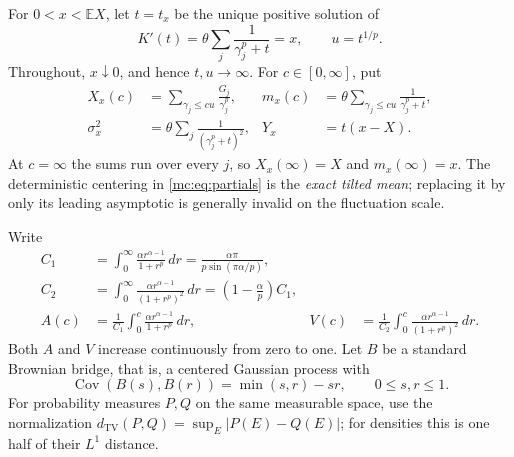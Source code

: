 For $0<x<\mathbb E X$, let $t=t_x$ be the unique positive solution of
\begin{equation}\label{mc:eq:saddle}
 K'(t)=\theta\sum_j\frac{1}{\gamma_j^p+t}=x,
 \qquad u=t^{1/p}.
\end{equation}
Throughout, $x\downarrow0$, and hence $t,u\longrightarrow\infty$.
For $c\in[0,\infty]$, put
\begin{align}
 X_x(c)&=\sum_{\gamma_j\leq cu}\frac{G_j}{\gamma_j^p},
 &m_x(c)&=\theta\sum_{\gamma_j\leq cu}\frac{1}{\gamma_j^p+t},
 \label{mc:eq:partials}\\
 \sigma_x^2&=\theta\sum_j\frac{1}{(\gamma_j^p+t)^2},
 &Y_x&=t(x-X).
 \label{mc:eq:sigma}
\end{align}
At $c=\infty$ the sums run over every $j$, so $X_x(\infty)=X$ and
$m_x(\infty)=x$.  The deterministic centering in
\eqref{mc:eq:partials} is the \emph{exact tilted mean}; replacing it by only
its leading asymptotic is generally invalid on the fluctuation scale.

Write
\begin{align}
 C_1&=\int_0^\infty\frac{\alpha r^{\alpha-1}}{1+r^p}\,dr
     =\frac{\alpha\pi}{p\sin(\pi\alpha/p)},
 \label{mc:eq:C1}\\
 C_2&=\int_0^\infty\frac{\alpha r^{\alpha-1}}{(1+r^p)^2}\,dr
     =\left(1-\frac\alpha p\right)C_1,
 \label{mc:eq:C2}\\
 A(c)&=\frac1{C_1}\int_0^c\frac{\alpha r^{\alpha-1}}{1+r^p}\,dr,
 &V(c)&=\frac1{C_2}\int_0^c\frac{\alpha r^{\alpha-1}}{(1+r^p)^2}\,dr.
 \label{mc:eq:profiles}
\end{align}
Both $A$ and $V$ increase continuously from zero to one.  Let $B$ be a
standard Brownian bridge, that is, a centered Gaussian process with
\[
 \operatorname{Cov}(B(s),B(r))=\min(s,r)-sr,\qquad 0\leq s,r\leq1.
\]
For probability measures $P,Q$ on the same measurable space, use the
normalization
$d_{\mathrm{TV}}(P,Q)=\sup_E|P(E)-Q(E)|$; for densities this is one half
of their $L^1$ distance.

